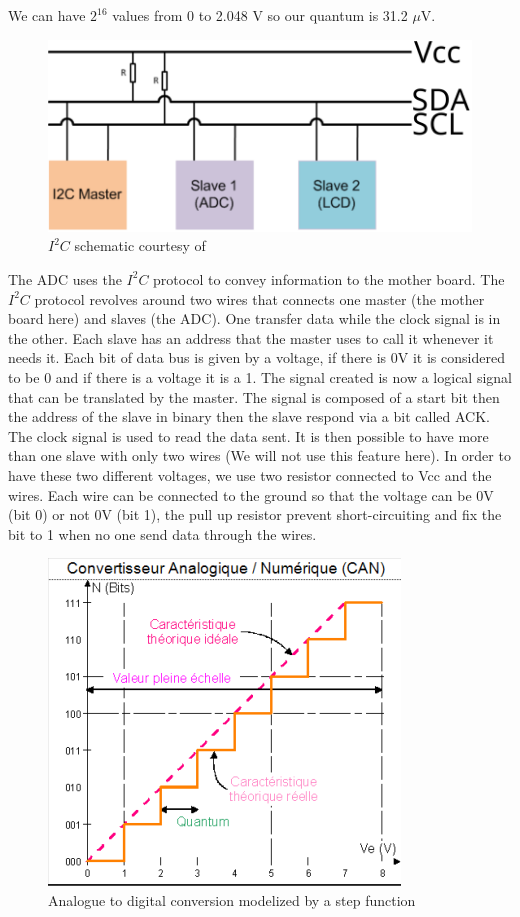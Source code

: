 \documentclass{article}[12pt]
\begin{document}
We can have $2^{16}$ values from 0 to 2.048 V so our quantum is 31.2 $\mu$V.
\begin{figure}[H]
    \centering
    \includegraphics[width=.5\textwidth]{figures/i2c_diagram.pdf}
    \caption{$I^2C$ schematic courtesy of \cite{Matworks-2022}}
    \label{fig:i2c_diagram}
\end{figure}
The ADC uses the $I^2C$ protocol to convey information to the mother board. 
The $I^2C$ protocol revolves around two wires that connects one master (the mother board here) and slaves (the ADC). 
One transfer data while the clock signal is in the other.
Each slave has an address that the master uses to call it whenever it needs it.
Each bit of data bus is given by a voltage, if there is 0V it is considered to be 0 and if there is a voltage it is a 1.
The signal created is now a logical signal that can be translated by the master.
The signal is composed of a start bit then the address of the slave in binary then the slave respond via a bit called ACK.
The clock signal is used to read the data sent.
It is then possible to have more than one slave with only two wires (We will not use this feature here).
In order to have these two different voltages, we use two resistor connected to Vcc and the wires.
Each wire can be connected to the ground so that the voltage can be 0V (bit 0) or not 0V (bit 1), the pull up resistor prevent short-circuiting and fix the bit to 1 when no one send data through the wires.
\begin{figure}[H]
    \centering
    \includegraphics[width=.4\textwidth]{figures/CAN.png}
    \caption{Analogue to digital conversion modelized by a step function \cite{CedricKillian-2020}}
    \label{fig:CAN_step}
\end{figure}
\end{document}
